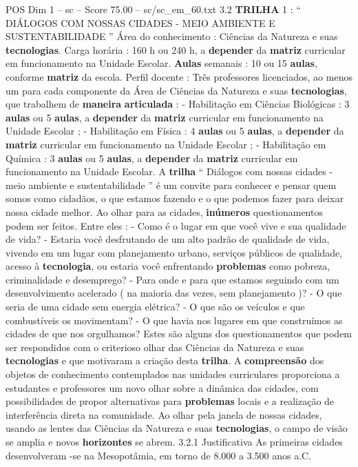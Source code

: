 \begin{textsample}{POS Dim 1 – sc – Score 75.00 – sc/sc\_em\_60.txt}  \label{ex:f1_pos_008}
3.2 \textbf{TRILHA} 1 : “ DIÁLOGOS COM NOSSAS CIDADES - MEIO AMBIENTE E SUSTENTABILIDADE ” Área do conhecimento : Ciências da Natureza e suas \textbf{tecnologias}.
Carga horária : 160 h ou 240 h, a \textbf{depender} da \textbf{matriz} curricular em funcionamento na Unidade Escolar. \textbf{Aulas} semanais : 10 ou 15 \textbf{aulas}, conforme \textbf{matriz} da escola.
Perfil docente : Três professores licenciados, ao menos um para cada componente da Área de Ciências da Natureza e suas \textbf{tecnologias}, que trabalhem de \textbf{maneira} \textbf{articulada} : - Habilitação em Ciências Biológicas : 3 \textbf{aulas} ou 5 \textbf{aulas}, a \textbf{depender} da \textbf{matriz} curricular em funcionamento na Unidade Escolar ; - Habilitação em Física : 4 \textbf{aulas} ou 5 \textbf{aulas}, a \textbf{depender} da \textbf{matriz} curricular em funcionamento na Unidade Escolar ; - Habilitação em Química : 3 \textbf{aulas} ou 5 \textbf{aulas}, a \textbf{depender} da \textbf{matriz} curricular em funcionamento na Unidade Escolar.
A \textbf{trilha} “ Diálogos com nossas cidades - meio ambiente e sustentabilidade ” é um convite para conhecer e pensar quem somos como cidadãos, o que estamos fazendo e o que podemos fazer para deixar nossa cidade melhor.
Ao olhar para as cidades, \textbf{inúmeros} questionamentos podem ser feitos.
Entre eles : - Como é o lugar em que você vive e sua qualidade de vida? - Estaria você desfrutando de um alto padrão de qualidade de vida, vivendo em um lugar com planejamento urbano, serviços públicos de qualidade, acesso à \textbf{tecnologia}, ou estaria você enfrentando \textbf{problemas} como pobreza, criminalidade e desemprego? - Para onde e para que estamos seguindo com um desenvolvimento acelerado ( na maioria das vezes, sem planejamento )? - O que seria de uma cidade sem energia elétrica? - O que são os veículos e que combustíveis os movimentam? - O que havia nos lugares em que construímos as cidades de que nos orgulhamos?
Estes são alguns dos questionamentos que podem ser respondidos com o criterioso olhar das Ciências da Natureza e suas \textbf{tecnologias} e que motivaram a criação desta \textbf{trilha}.
A \textbf{compreensão} dos objetos de conhecimento contemplados nas unidades curriculares proporciona a estudantes e professores um novo olhar sobre a dinâmica das cidades, com possibilidades de propor alternativas para \textbf{problemas} locais e a realização de interferência direta na comunidade.
Ao olhar pela janela de nossas cidades, usando as lentes das Ciências da Natureza e suas \textbf{tecnologias}, o campo de visão se amplia e novos \textbf{horizontes} se abrem. 3.2.1 Justificativa As primeiras cidades desenvolveram -se na Mesopotâmia, em torno de 8.000 a 3.500 anos a.C.

\end{textsample}
